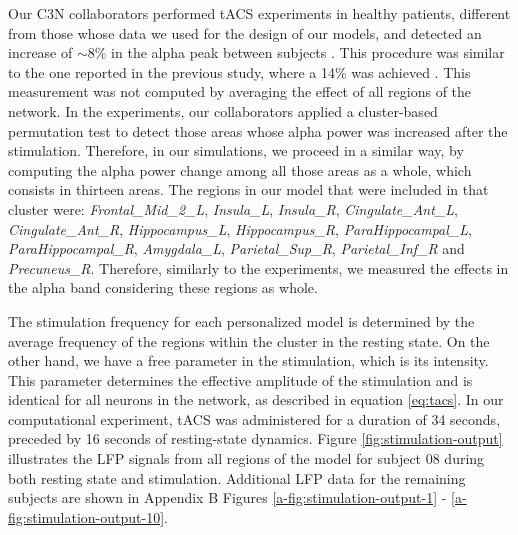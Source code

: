 \documentclass[../main.tex]{subfiles}
\begin{document}
Our C3N collaborators performed tACS experiments in healthy patients, different from those whose data we used for the design of our models, and detected an increase of $\sim 8\%$ in the alpha peak between subjects \citep{cabrera-alvarez_understanding_2023}.
This procedure was similar to the one reported in the previous study, where a 14\% was achieved \citep{zaehle_transcranial_2010}.
This measurement was not computed by averaging the effect of all regions of the network.
In the experiments, our collaborators applied a cluster-based permutation test to detect those areas whose alpha power was increased after the stimulation.
Therefore, in our simulations, we proceed in a similar way, by computing the alpha power change among all those areas as a whole, which consists in thirteen areas.
The regions in our model that were included in that cluster were: \textit{Frontal\_Mid\_2\_L}, \textit{Insula\_L}, \textit{Insula\_R}, \textit{Cingulate\_Ant\_L}, \textit{Cingulate\_Ant\_R}, \textit{Hippocampus\_L}, \textit{Hippocampus\_R}, \textit{ParaHippocampal\_L}, \textit{ParaHippocampal\_R}, \textit{Amygdala\_L}, \textit{Parietal\_Sup\_R}, \textit{Parietal\_Inf\_R} and \textit{Precuneus\_R}.
Therefore, similarly to the experiments, we measured the effects in the alpha band considering these regions as whole.

The stimulation frequency for each personalized model is determined by the average frequency of the regions within the cluster in the resting state.
On the other hand, we have a free parameter in the stimulation, which is its intensity.
This parameter determines the effective amplitude of the stimulation and is identical for all neurons in the network, as described in equation \eqref{eq:tacs}.
In our computational experiment, tACS was administered for a duration of 34 seconds, preceded by 16 seconds of resting-state dynamics.
Figure \ref{fig:stimulation-output} illustrates the LFP signals from all regions of the model for subject 08 during both resting state and stimulation.
Additional LFP data for the remaining subjects are shown in Appendix B Figures \ref{a-fig:stimulation-output-1} - \ref{a-fig:stimulation-output-10}.
\end{document}
